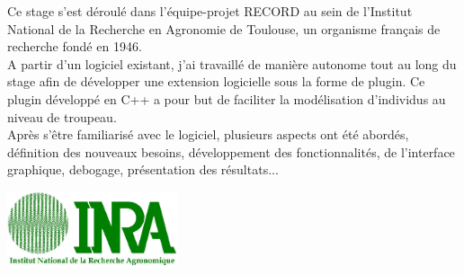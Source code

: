 \begin{titlepage}
\begin{center}
\justify
Ce stage s'est déroulé dans l'équipe-projet RECORD au sein de l'Institut National de la Recherche en Agronomie de Toulouse, un organisme français de recherche fondé en 1946.\\
A partir d'un logiciel existant, j'ai travaillé de manière autonome tout au long du stage afin de développer une extension logicielle sous la forme de plugin. Ce plugin développé en C++ a pour but de faciliter la modélisation d'individus au niveau de troupeau.\\
Après s'être familiarisé avec le logiciel, plusieurs aspects ont été abordés, définition des nouveaux besoins, développement des fonctionnalités, de l'interface graphique, debogage, présentation des résultats...
\vfill

\center
\vspace*{0.3cm}
\includegraphics [width=50mm]{images/logoINRA.jpg} \\[0.6cm]
\end{center}

\end{titlepage}
